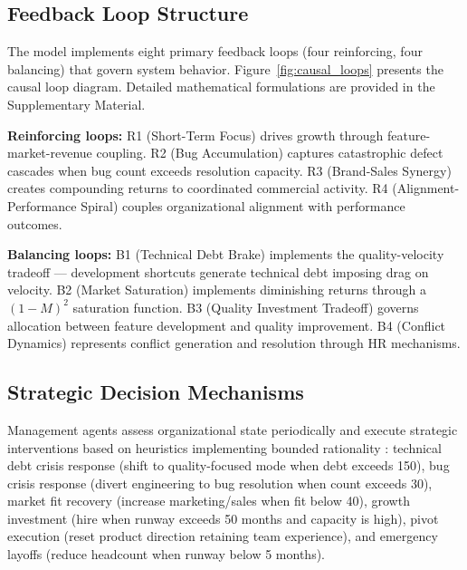 \documentclass[alpha-refs]{wiley-article}
\begin{document}
\subsection{Feedback Loop Structure}

The model implements eight primary feedback loops (four reinforcing, four balancing) that govern system behavior. Figure~\ref{fig:causal_loops} presents the causal loop diagram. Detailed mathematical formulations are provided in the Supplementary Material.

\textbf{Reinforcing loops:} R1 (Short-Term Focus) drives growth through feature-market-revenue coupling. R2 (Bug Accumulation) captures catastrophic defect cascades when bug count exceeds resolution capacity. R3 (Brand-Sales Synergy) creates compounding returns to coordinated commercial activity. R4 (Alignment-Performance Spiral) couples organizational alignment with performance outcomes.

\textbf{Balancing loops:} B1 (Technical Debt Brake) implements the quality-velocity tradeoff \cite{lehman1996feedback, franco2023systems} — development shortcuts generate technical debt imposing drag on velocity. B2 (Market Saturation) implements diminishing returns through a $(1-M)^2$ saturation function. B3 (Quality Investment Tradeoff) governs allocation between feature development and quality improvement. B4 (Conflict Dynamics) represents conflict generation and resolution through HR mechanisms.

\subsection{Strategic Decision Mechanisms}

Management agents assess organizational state periodically and execute strategic interventions based on heuristics implementing bounded rationality \cite{petkov2008information}: technical debt crisis response (shift to quality-focused mode when debt exceeds 150), bug crisis response (divert engineering to bug resolution when count exceeds 30), market fit recovery (increase marketing/sales when fit below 40), growth investment (hire when runway exceeds 50 months and capacity is high), pivot execution (reset product direction retaining team experience), and emergency layoffs (reduce headcount when runway below 5 months).
\end{document}
